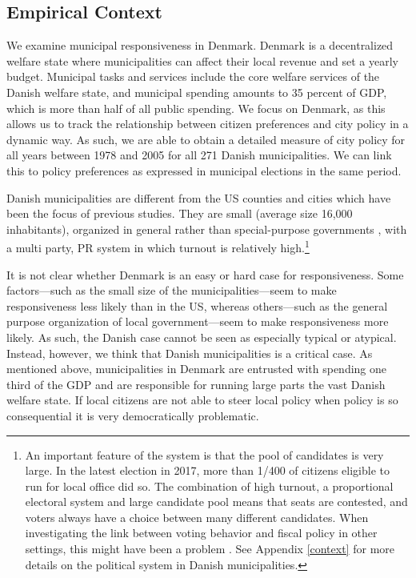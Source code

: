 \documentclass[a4paper,12pt]{article}
\begin{document}
\subsection*{Empirical Context}
We examine municipal responsiveness in Denmark. Denmark is a decentralized welfare state where municipalities can affect their local revenue and set a yearly budget.  Municipal tasks and services include the core welfare services of the Danish welfare state, and municipal spending amounts to 35 percent of GDP, which is more than half of all public spending. We focus on Denmark, as this allows us to track the relationship between citizen preferences and city policy in a dynamic way. As such, we are able to obtain a detailed measure of city policy for all years between 1978 and 2005 for all 271 Danish municipalities.  We can link this to policy preferences as expressed in municipal elections in the same period.
 

Danish municipalities are different from the US counties and cities which have been the focus of previous studies. They are small (average size 16,000 inhabitants), organized in general rather than special-purpose governments \citep{berry2009imperfect}, with a multi party, PR system in which turnout is relatively high.\footnote{An important feature of the system is that the pool of candidates is very large. In the latest election in 2017, more than 1/400 of citizens eligible to run for local office did so. The combination of high turnout, a proportional electoral system and large candidate pool means that seats are contested, and voters always have a choice between many different candidates. When investigating the link between voting behavior and fiscal policy in other settings, this might have been a problem \citep[see][]{suzuki2018does}. See Appendix \ref{context} for more details on the political system in Danish municipalities.} 


It is not clear whether Denmark is an easy or hard case for responsiveness.  Some factors---such as the small size of the municipalities---seem to make responsiveness less likely than in the US, whereas others---such as the general purpose organization of local government---seem to make responsiveness more likely. As such, the Danish case cannot be seen as especially typical or atypical. Instead, however, we think that Danish municipalities is a critical case. As mentioned above, municipalities in Denmark are entrusted with spending one third of the GDP and are responsible for running large parts the vast Danish welfare state. If local citizens are not able to steer local policy when policy is so consequential it is very democratically problematic.
\end{document}
